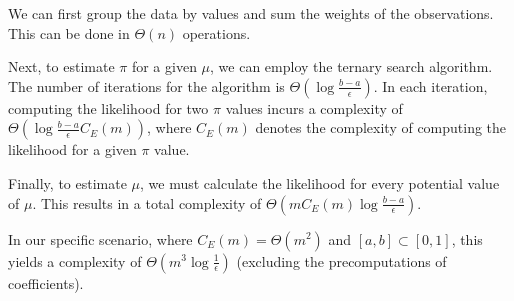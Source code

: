 We can first group the data by values and sum the weights of the observations. This can be done in $\Theta(n)$ operations.

Next, to estimate $\pi$ for a given $\mu$, we can employ the ternary search algorithm. The number of iterations for the algorithm is $\Theta(\log \frac{b - a}{\epsilon})$. In each iteration, computing the likelihood for two $\pi$ values incurs a complexity of $\Theta(\log \frac{b - a}{\epsilon} C_E(m))$, where $C_E(m)$ denotes the complexity of computing the likelihood for a given $\pi$ value.

Finally, to estimate $\mu$, we must calculate the likelihood for every potential value of $\mu$. This results in a total complexity of $\Theta(m C_E(m) \log \frac{b - a}{\epsilon} )$.

In our specific scenario, where $C_E(m) = \Theta(m^2)$ and $[a, b] \subset [0, 1]$, this yields a complexity of $\Theta(m^3 \log \frac{1}{\epsilon})$ (excluding the precomputations of coefficients).
